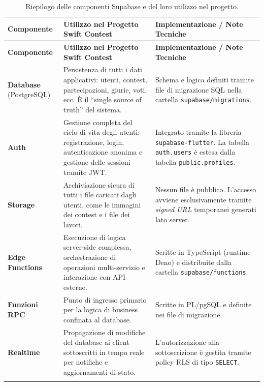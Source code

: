 \begin{longtable}{p{} p{} p{}}
    \toprule
    \textbf{Componente} & \textbf{Utilizzo nel Progetto Swift Contest} & \textbf{Implementazione / Note Tecniche} \\
    \midrule
    \endfirsthead
    \toprule
    \textbf{Componente} & \textbf{Utilizzo nel Progetto Swift Contest} & \textbf{Implementazione / Note Tecniche} \\
    \midrule
    \endhead

    \textbf{Database} \newline (PostgreSQL) &
    Persistenza di tutti i dati applicativi: utenti, contest, partecipazioni, giurie, voti, ecc.
    È il ``single source of truth'' del sistema.
    &
    Schema e logica definiti tramite file di migrazione SQL nella cartella \texttt{supabase/migrations}. \\
    \midrule

    \textbf{Auth} &
    Gestione completa del ciclo di vita degli utenti: registrazione, login, autenticazione anonima e gestione delle sessioni tramite JWT. &
    Integrato tramite la libreria \texttt{supabase-flutter}.
    La tabella \texttt{auth.users} è estesa dalla tabella \texttt{public.profiles}. \\
    \midrule

    \textbf{Storage} &
    Archiviazione sicura di tutti i file caricati dagli utenti, come le immagini dei contest e i file dei lavori.
    &
    Nessun file è pubblico.
    L'accesso avviene esclusivamente tramite \emph{signed URL} temporanei generati lato server. \\
    \midrule

    \textbf{Edge Functions} &
    Esecuzione di logica server-side complessa, orchestrazione di operazioni multi-servizio e interazione con API esterne.
    &
    Scritte in TypeScript (runtime Deno) e distribuite dalla cartella \texttt{supabase/functions}. \\
    \midrule

    \textbf{Funzioni RPC} &
    Punto di ingresso primario per la logica di business confinata al database.
    &
    Scritte in PL/pgSQL e definite nei file di migrazione. \\
    \midrule

    \textbf{Realtime} &
    Propagazione di modifiche del database ai client sottoscritti in tempo reale per notifiche e aggiornamenti di stato.
    &
    L'autorizzazione alla sottoscrizione è gestita tramite policy RLS di tipo \texttt{SELECT}. \\

    \bottomrule
    \caption{Riepilogo delle componenti Supabase e del loro utilizzo nel progetto.}
    \label{tab:supabase_components}
\end{longtable}


